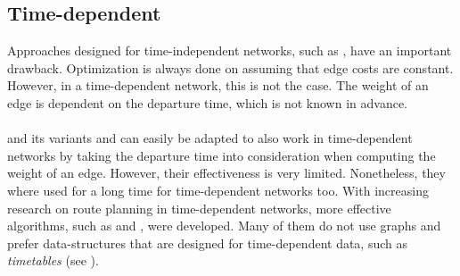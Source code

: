 \subsection{Time-dependent}\label{time_dependent_sec}
	Approaches designed for time-independent networks, such as \alt, have an important drawback. Optimization is always done on
	assuming that edge costs are constant. However, in a time-dependent network, this is not the case. The weight of an edge is
	dependent on the departure time, which is not known in advance.\\\\
	\dijkstra and its variants \astar and \alt can easily be adapted to also work in time-dependent networks by taking the departure
	time into consideration when computing the weight of an edge. However, their effectiveness is very limited.
	Nonetheless, they where used for a long time for time-dependent networks too. With increasing research on route
	planning in time-dependent networks, more effective algorithms, such as \transferPatterns {}
	and \csa {}, were developed. Many of them do not use graphs and prefer data-structures that are designed
	for time-dependent data, such as \textit{timetables} (see ).

